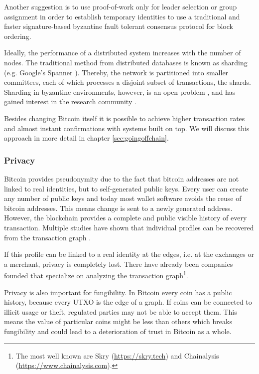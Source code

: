 Another suggestion is to use proof-of-work only for leader selection \parencite{194906} or group assignment \parencite{DBLP:journals/corr/Kokoris-KogiasJ16} in order to establish temporary identities to use a traditional and faster signature-based byzantine fault tolerant consensus protocol for block ordering. 

Ideally, the performance of a distributed system increases with the number of nodes. The traditional method from distributed databases is known as sharding (e.g. Google's Spanner \parencite{Corbett2012Spanner}). Thereby, the network is partitioned into smaller committees, each of which processes a disjoint subset of transactions, the shards. Sharding in byzantine environments, however, is an open problem \parencite{croman2016scaling}, and has gained interest in the research community \parencite{Luu2016Sharding,Gencer2016Aspen}.
 
Besides changing Bitcoin itself it is possible to achieve higher transaction rates and almost instant confirmations with systems built on top. We will discuss this approach in more detail in chapter \ref{sec:goingoffchain}.
 
\subsubsection{Privacy}
\label{sec:crypto_chall_privacy}

Bitcoin provides pseudonymity due to the fact that bitcoin addresses are not linked to real identities, but to self-generated public keys. Every user can create any number of public keys and today most wallet software avoids the reuse of bitcoin addresses. This means change is sent to a newly generated address. However, the blockchain provides a complete and public visible history of every transaction. Multiple studies have shown that individual profiles can be recovered from the transaction graph \parencite{Ron2013,Androulaki2013,Reid2013,Babaioff:2012:BRB:2229012.2229022,fi5020237,Spagnuolo2014}.

If this profile can be linked to a real identity at the edges, i.e. at the exchanges or a merchant, privacy is completely lost. There have already been companies founded that specialize on analyzing the transaction graph\footnote{The most well known are Skry (\url{https://skry.tech}) and Chainalysis (\url{https://www.chainalysis.com}).}.

Privacy is also important for fungibility. In Bitcoin every coin has a public history, because every \ac{UTXO} is the edge of a graph. If coins can be connected to illicit usage or theft, regulated parties may not be able to accept them. This means the value of particular coins might be less than others which breaks fungibility and could lead to a deterioration of trust in Bitcoin as a whole.

